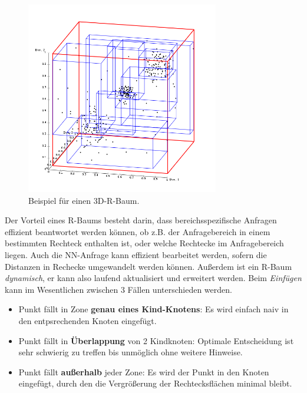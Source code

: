 \begin{figure}[ht]
	\centering
	\includegraphics[width=0.75\textwidth]{Figures/r_tree3D}
	\caption[R-Baum 3D]{Beispiel für einen 3D-R-Baum.\footnotemark}
	\label{fig:r_tree3D}
\end{figure}

Der Vorteil eines R-Baums besteht darin, dass bereichsspezifische Anfragen effizient
beantwortet werden können, ob z.B. der Anfragebereich in einem bestimmten Rechteck
enthalten ist, oder welche Rechtecke im Anfragebereich liegen. Auch die NN-Anfrage
kann effizient bearbeitet werden,
sofern die Distanzen in Rechecke umgewandelt werden können.
Außerdem ist ein R-Baum \textit{dynamisch}, er 	kann also laufend
aktualisiert und erweitert werden. Beim \textit{Einfügen} kann im Wesentlichen
zwischen 3 Fällen unterschieden werden. 

\begin{itemize}
	\item Punkt fällt in Zone \textbf{genau eines Kind-Knotens}: Es wird einfach naiv
		in den entpsrechenden Knoten eingefügt.
	\item Punkt fällt in \textbf{Überlappung} von 2 Kindknoten: Optimale Entscheidung ist
		sehr schwierig zu treffen bis unmöglich ohne weitere Hinweise.
	\item Punkt fällt \textbf{außerhalb} jeder Zone: Es wird der Punkt in den Knoten
		eingefügt, durch den die Vergrößerung der Rechtecksflächen minimal
		bleibt.
\end{itemize}

